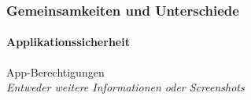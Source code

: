 \begin{frame}
\frametitle{Gemeinsamkeiten und Unterschiede}
\framesubtitle{Applikationssicherheit}
App-Berechtigungen\\
\small\textsl{Entweder weitere Informationen oder Screenshots}
\end{frame}